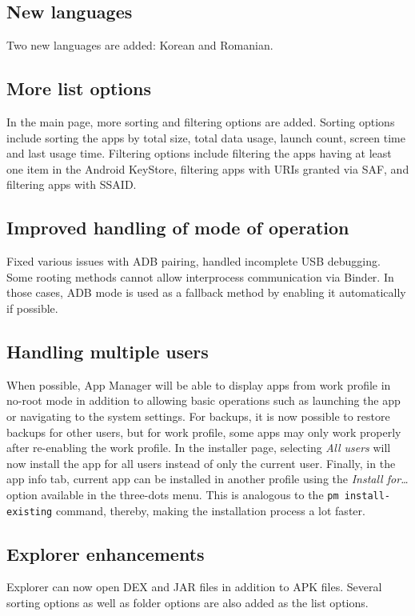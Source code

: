\subsection{New languages}
Two new languages are added: Korean and Romanian.

\subsection{More list options}
In the main page, more sorting and filtering options are added. Sorting options include sorting the apps by total size,
total data usage, launch count, screen time and last usage time. Filtering options include filtering the apps having
at least one item in the Android KeyStore, filtering apps with URIs granted via SAF, and filtering apps with SSAID\@.

\subsection{Improved handling of mode of operation}
Fixed various issues with ADB pairing, handled incomplete USB debugging. Some rooting methods cannot allow interprocess
communication via Binder. In those cases, ADB mode is used as a fallback method by enabling it automatically if possible.

\subsection{Handling multiple users}
When possible, App Manager will be able to display apps from work profile in no-root mode in addition to allowing basic operations such as launching the app or navigating to the system settings.
For backups, it is now possible to restore backups for other users, but for work profile, some apps may only work properly after re-enabling the work profile.
In the installer page, selecting \textit{All users} will now install the app for all users instead of only the current user.
Finally, in the app info tab, current app can be installed in another profile using the \textit{Install for\dots} option available in the three-dots menu.
This is analogous to the \texttt{pm install-existing} command, thereby, making the installation process a lot faster.

\subsection{Explorer enhancements}
Explorer can now open DEX and JAR files in addition to APK files. Several sorting options as well as folder options are also added as the list options.

